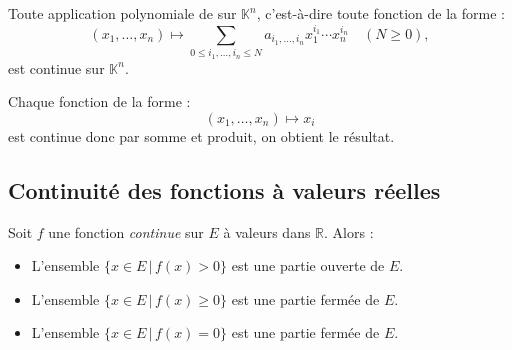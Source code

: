 \documentclass[french,11pt,twoside]{VcCours}
\begin{document}
\begin{Proposition}{} Toute application polynomiale de sur $\mathbb{K}^n$, c'est-à-dire toute fonction de la forme :
$$ (x_1, \ldots, x_n) \mapsto \sum_{0 \leq i_1, \ldots, i_n \leq N} a_{i_1, \ldots, i_n} x_1^{i_1} \cdots x_n^{i_n} \quad (N \geq 0),$$
est continue sur $\mathbb{K}^n$.
\end{Proposition}

\begin{Demonstration}{} Chaque fonction de la forme :
$$  (x_1, \ldots, x_n) \mapsto x_i$$
est continue donc par somme et produit, on obtient le résultat.
\end{Demonstration}



\subsection{Continuité des fonctions à valeurs réelles}

\begin{Proposition}{} Soit $f$ une fonction \emph{continue} sur $E$ à valeurs dans $\mathbb{R}$. Alors :

\begin{itemize}
\item L'ensemble $\lbrace x \in E \, \vert \, f(x)>0 \rbrace$ est une partie ouverte de $E$.
\item L'ensemble $\lbrace x \in E \, \vert \, f(x)\geq 0 \rbrace$ est une partie fermée de $E$.
\item L'ensemble $\lbrace x \in E \, \vert \, f(x) = 0 \rbrace$ est une partie fermée de $E$.
\end{itemize}
\end{Proposition}

\begin{Demonstration}{} 

\end{Demonstration}
\end{document}
